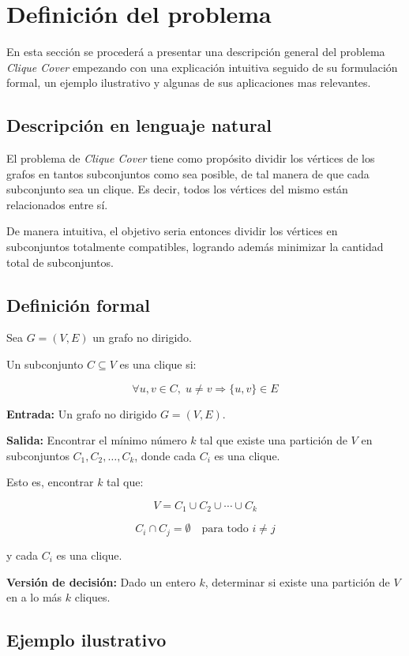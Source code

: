 \section{Definición del problema}

En esta sección se procederá a presentar una descripción general del problema \textit{Clique Cover} empezando con una explicación intuitiva seguido de su formulación formal, un ejemplo ilustrativo y algunas de sus aplicaciones mas relevantes. 

\subsection{Descripción en lenguaje natural}

El problema de \textit{Clique Cover} tiene como propósito dividir los vértices de los grafos en tantos subconjuntos como sea posible, de tal manera de que cada subconjunto sea un clique. Es decir, todos los vértices del mismo están relacionados entre sí.

De manera intuitiva, el objetivo seria entonces dividir los vértices en subconjuntos totalmente compatibles, logrando además minimizar la cantidad total de subconjuntos.

\subsection{Definición formal}

Sea $G = (V, E)$ un grafo no dirigido.

Un subconjunto $C \subseteq V$ es una clique si:

\[
\forall u, v \in C,\; u \neq v \Rightarrow \{u,v\} \in E
\]

\textbf{Entrada:} Un grafo no dirigido $G = (V, E)$.

\textbf{Salida:} Encontrar el mínimo número $k$ tal que existe una partición de $V$ en subconjuntos $C_1, C_2, \dots, C_k$, donde cada $C_i$ es una clique.

Esto es, encontrar $k$ tal que:

\[
V = C_1 \cup C_2 \cup \cdots \cup C_k
\]

\[
C_i \cap C_j = \emptyset \quad \text{para todo } i \neq j
\]

y cada $C_i$ es una clique.

\textbf{Versión de decisión:} Dado un entero $k$, determinar si existe una partición de $V$ en a lo más $k$ cliques.


\subsection{Ejemplo ilustrativo}

